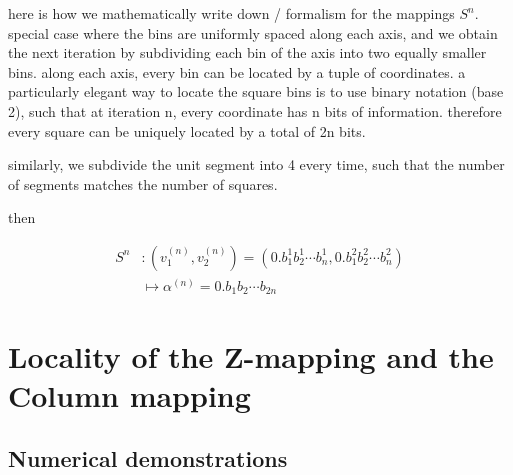 \documentclass[10pt,letterpaper]{article}
\begin{document}
here is how we mathematically write down / formalism for the mappings $S^n$.
special case where the bins are uniformly spaced along each axis, and we obtain the next iteration by subdividing each bin of the axis into two equally smaller bins.
along each axis, every bin can be located by a tuple of coordinates. a particularly elegant way to locate the square bins is to use binary notation (base 2), such that at iteration n, every coordinate has n bits of information. therefore every square can be uniquely located by a total of 2n bits.

similarly, we subdivide the unit segment into 4 every time, such that the number of segments matches the number of squares.

then

\begin{equation} \begin{aligned}
S^n &: (v_1^{(n)}, v_2^{(n)}) = (0.b_1^1 b_2^1 \cdots b_n^1, 0.b_1^2 b_2^2 \cdots b_n^2) \\
&\mapsto \alpha^{(n)} = 0.b_1 b_2 \cdots b_{2n}
\end{aligned} \end{equation}


\section{Locality of the Z-mapping and the Column mapping}









\subsection{Numerical demonstrations}
\end{document}
